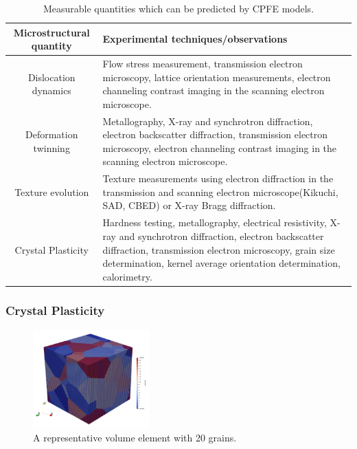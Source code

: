 \begin{table}[H]
\centering
\caption{Measurable quantities which can be predicted by CPFE models.}
\renewcommand\arraystretch{1.2}
\renewcommand\baselinestretch{1.2}
\begin{tabular}{|c|m{10cm}|}
\hline

  \textbf{Microstructural quantity} & \textbf{Experimental techniques/observations} \\
  \hline
  Dislocation dynamics & Flow stress measurement, transmission electron microscopy, lattice orientation measurements, electron channeling contrast imaging in the scanning electron microscope.  \\
  \hline
  Deformation twinning & Metallography, X-ray and synchrotron diffraction, electron backscatter diffraction, transmission electron microscopy, electron channeling contrast imaging in the scanning electron microscope. \\
  \hline
  Texture evolution & Texture measurements using electron diffraction in the transmission and scanning electron microscope(Kikuchi, SAD, CBED) or X-ray Bragg diffraction.  \\
  \hline
  Crystal Plasticity & Hardness testing, metallography, electrical resistivity, X-ray and synchrotron diffraction, electron backscatter diffraction, transmission electron microscopy, grain size determination, kernel average orientation determination, calorimetry.  \\

 \hline
\end{tabular}

\label{Microstructural_parameter_exp_technique}
\end{table}



\subsubsection{Crystal Plasticity}

\begin{figure}
    \centering 
    \includegraphics[width=0.4\textwidth]{images/RVE.png}
    \caption{A representative volume element with 20 grains.}
    \label{RVE}
\end{figure}

